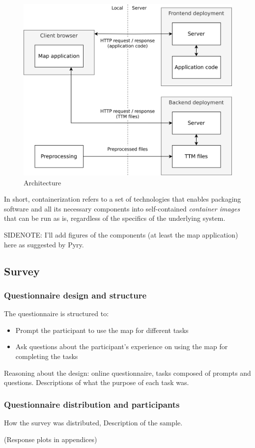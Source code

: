 \begin{figure}[H]
	\centering
	\includegraphics[width=\diagramwidth]{visual/figures/diagrams/architechture.png}
	\caption{Architecture}
	\label{fig:architechture}
\end{figure}

In short, containerization refers to a set of technologies
that enables packaging software and all its necessary components
into self-contained \textit{container images} that can be run as is,
regardless of the specifics of the underlying system.

SIDENOTE: I'll add figures of the components (at least the map application) here as suggested by Pyry.






\subsection{Survey}

\subsubsection{Questionnaire design and structure}

The questionnaire is structured to:
\begin{itemize}
	\item Prompt the participant to use the map for different tasks
	\item Ask questions about the participant's experience
	on using the map for completing the tasks
\end{itemize}

Reasoning about the design: online questionnaire, tasks composed of prompts and questions.
Descriptions of what the purpose of each task was.

\subsubsection{Questionnaire distribution and participants}
How the survey was distributed,
Description of the sample.

(Response plots in appendices)
